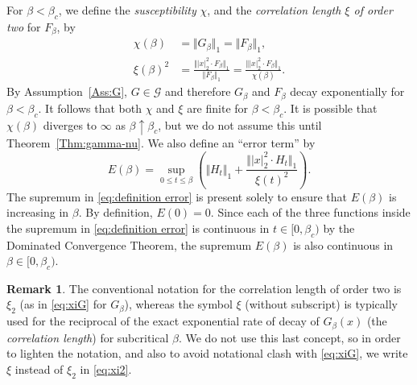 \documentclass[11pt,a4paper]{article}
\numberwithin{equation}{section}
\theoremstyle{plain}
\theoremstyle{definition}
\newtheorem{Rem}[Thm]{Remark}
\newcommand\1{\mathds{1}}
\begin{document}
For $\beta<\beta_c$, we define the \emph{susceptibility} $\chi$, and
the \emph{correlation length $\xi$ of order two} for $F_\beta$, by
\begin{align}
    \chi(\beta)& =\Vert   G_\beta \Vert_1=\Vert   F_\beta \Vert_1,
    \\
\label{eq:xi2}
    \xi (\beta)^2 &=\frac{\Vert |x|_2^2\cdot F_\beta \Vert_1}{\Vert F_\beta \Vert_1}
    =\frac{\Vert |x|_2^2\cdot F_\beta \Vert_1}{\chi(\beta)}.
\end{align}
By Assumption~\ref{Ass:G}, $G\in \mathcal{G}$ and therefore
$G_\beta$ and $F_\beta$ decay exponentially for $\beta<\beta_c$.  It follows that
both $\chi$ and $\xi$ are finite for $\beta<\beta_c$.  It is possible that
$\chi(\beta)$ diverges to $\infty$ as $\beta \uparrow \beta_c$, but we do not
assume this until Theorem~\ref{Thm:gamma-nu}.
We also define an ``error term'' by
\begin{equation}\label{eq:definition error}
	E(\beta) =
    \sup_{0\leq t\leq \beta}\left(\Vert H_t \Vert_1 + \frac{\Vert |x|_2^2\cdot H_t \Vert_1}{\xi (t)^2}\right).
\end{equation}
The supremum in \eqref{eq:definition error} is present solely
to ensure that $E(\beta)$ is increasing in $\beta$.
By definition, $E(0)=0$.
Since each of the three functions inside the supremum in \eqref{eq:definition error}
is continuous in $t\in [0,\beta_c)$ by the Dominated Convergence Theorem, the supremum
$E(\beta)$ is also continuous in $\beta \in [0,\beta_c)$.



\begin{Rem}
The conventional notation for the correlation length of order two is
$\xi_2$ (as in \eqref{eq:xiG} for $G_\beta$), whereas
the symbol $\xi$ (without subscript)
is typically used for the reciprocal of the exact exponential rate of decay
of $G_\beta(x)$ (the \emph{correlation length})
for subcritical $\beta$.  We do not use this last concept, so in order to lighten the
notation, and also to avoid notational clash with \eqref{eq:xiG},
we write $\xi$ instead of $\xi_2$ in \eqref{eq:xi2}.
\end{Rem}
\end{document}
